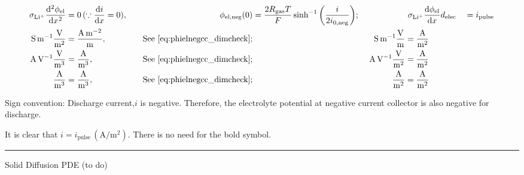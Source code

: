 \documentclass{article}
\begin{document}
\begin{alignat}{4}
    \sigma_\mathrm{Li^+}\diff[2]{\phi_\text{el}}{x} &= 0\, (\because \diff{i}{x}=0),  &\qquad \phi_\text{el,neg}(0) &= \frac{2 R_\text{gas} T}{F} \sinh^{-1}\bigg(\frac{i}{2 i_\text{0,neg}}\bigg); &&\  \sigma_\mathrm{Li^+}\diff{\phi_\text{el}}{x}{d_\text{elec}} &&= i_\text{pulse} \\
    \si{\siemens\per\metre}\frac{\si{\volt}}{\si{\meter\squared}} &= \frac{\si{\ampere\per\meter\squared}}{\si{\meter}}, &\quad \text{See}~\eqref{eq:phielnegcc_dimcheck}; &&\ \si{\siemens\per\meter}\frac{\si{\volt}}{\si{\meter}} &= \frac{\si{\ampere}}{\si{\meter\squared}} \\
    \si{\ampere\per\volt}\frac{\si{\volt}}{\si{\meter\cubed}} &= \frac{\si{\ampere}}{\si{\meter\cubed}}, &\quad \text{See}~\eqref{eq:phielnegcc_dimcheck}; &&\ \si{\ampere\per\volt}\frac{\si{\volt}}{\si{\meter\squared}} &= \frac{\si{\ampere}}{\si{\meter\squared}} \\
    \frac{\si{\ampere}}{\si{\meter\cubed}} &= \frac{\si{\ampere}}{\si{\meter\cubed}}, &\quad \text{See}~\eqref{eq:phielnegcc_dimcheck}; &&\ \frac{\si{\ampere}}{\si{\meter\squared}} &= \frac{\si{\ampere}}{\si{\meter\squared}} \\
\end{alignat}

Sign convention: Discharge current,\(i\) is negative.  Therefore, the electrolyte potential at negative current collector is also negative for discharge.


It is clear that \(i = i_\text{pulse}\, (\si{\ampere\per\meter\squared})\). There is no need for the bold symbol.

\medskip
\hrule

\bigskip

Solid Diffusion PDE (to do)
\end{document}
